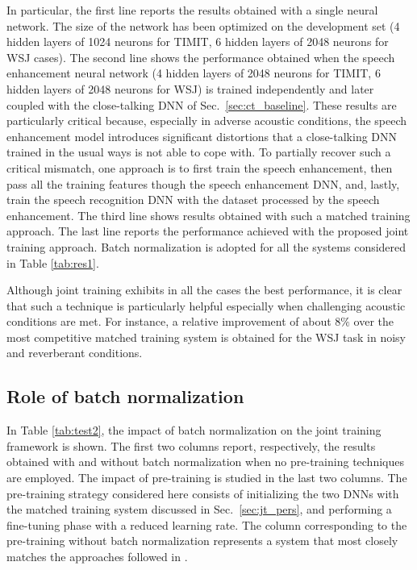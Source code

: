 \documentclass{article}
\begin{document}
In particular, the first line reports the results obtained with a single neural network. The size of the network has been optimized on the development set (4 hidden layers of 1024 neurons for TIMIT, 6 hidden layers of 2048 neurons for WSJ cases). The second line shows the performance obtained when the speech enhancement neural network (4 hidden layers of 2048 neurons for TIMIT, 6 hidden layers of 2048 neurons for WSJ) is trained independently and later coupled with the close-talking DNN of Sec.~\ref{sec:ct_baseline}. These results are particularly critical because, especially in adverse acoustic conditions, the speech enhancement model introduces significant distortions that a close-talking DNN trained in the usual ways is not able to cope with. To partially recover such a critical mismatch, one approach is to first train the speech enhancement, then pass all the training features though the speech enhancement DNN, and, lastly, train the speech recognition DNN with the dataset processed by the speech enhancement. The third line shows results obtained with such a matched training approach. The last line reports the performance achieved with the proposed joint training approach. Batch normalization is adopted for all the systems considered in Table \ref{tab:res1}.

Although joint training exhibits in all the cases the best performance, it is clear that such a technique is particularly helpful especially when challenging acoustic conditions are met. For instance, a relative improvement of about $8\%$ over the most competitive matched training system is obtained for the WSJ task in noisy and reverberant conditions.

\subsection{Role of batch normalization}
In Table \ref{tab:test2}, the impact of batch normalization on the joint training framework is shown.
The first two columns report, respectively, the results obtained with and without batch normalization when no pre-training techniques are employed. The impact of pre-training is studied in the last two columns. The pre-training strategy considered here consists of initializing the two DNNs with the matched training system discussed in Sec.~\ref{sec:jt_pers}, and performing a fine-tuning phase with a reduced learning rate. The column corresponding to the pre-training without batch normalization represents a system that most closely matches the approaches followed in \cite{joint1,joint3}. 
\end{document}
